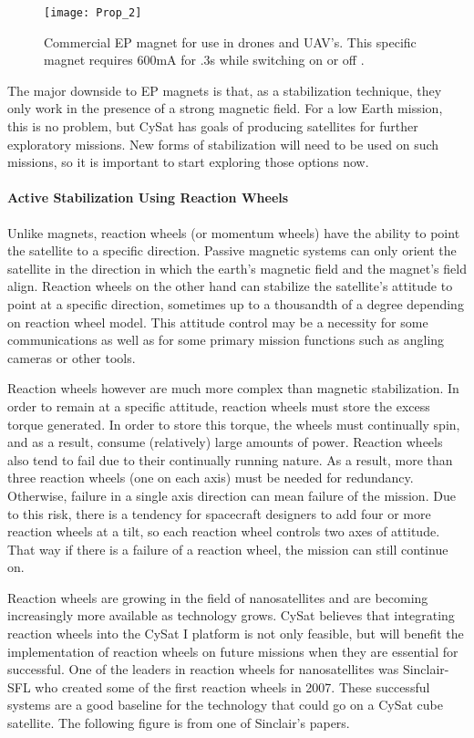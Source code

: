 \documentclass[nocover]            %
{CSLI}                       %
\begin{document}
\begin{figure}[H]
\centering
    \texttt{[image: Prop\_2]}
    \caption{Commercial EP magnet for use in drones and UAV's. This specific magnet requires 600mA for .3s while switching on or off \cite{NicaDrone}.}
\end{figure}

The major downside to EP magnets is that, as a stabilization technique, they only work in the presence of a strong magnetic field. For a low Earth mission, this is no problem, but CySat has goals of producing satellites for further exploratory missions. New forms of stabilization will need to be used on such missions, so it is important to start exploring those options now.
\paragraph{Active Stabilization Using Reaction Wheels\\}
Unlike magnets, reaction wheels (or momentum wheels) have the ability to point the satellite to a specific direction. Passive magnetic systems can only orient the satellite in the direction in which the earth's magnetic field and the magnet's field align. Reaction wheels on the other hand can stabilize the satellite's attitude to point at a specific direction, sometimes up to a thousandth of a degree depending on reaction wheel model. This attitude control may be a necessity for some communications as well as for some primary mission functions such as angling cameras or other tools. 

Reaction wheels however are much more complex than magnetic stabilization. In order to remain at a specific attitude, reaction wheels must store the excess torque generated. In order to store this torque, the wheels must continually spin, and as a result, consume (relatively) large amounts of power. Reaction wheels also tend to fail due to their continually running nature. As a result, more than three reaction wheels (one on each axis) must be needed for redundancy. Otherwise, failure in a single axis direction can mean failure of the mission. Due to this risk, there is a tendency for spacecraft designers to add four or more reaction wheels at a tilt, so each reaction wheel controls two axes of attitude. That way if there is a failure of a reaction wheel, the mission can still continue on. 

Reaction wheels are growing in the field of nanosatellites and are becoming increasingly more available as technology grows. CySat believes that integrating reaction wheels into the CySat I platform is not only feasible, but will benefit the implementation of reaction wheels on future missions when they are essential for successful. One of the leaders in reaction wheels for nanosatellites was Sinclair-SFL who created some of the first reaction wheels in 2007. These successful systems are a good baseline for the technology that could go on a CySat cube satellite. The following figure is from one of Sinclair's papers. 
\end{document}
